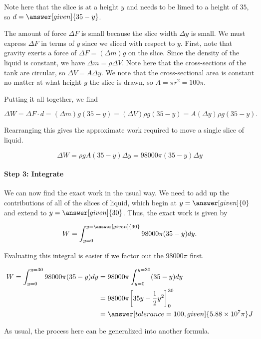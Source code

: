 \documentclass{ximera}
\begin{document}
\begin{model}
\begin{explanation}
Note here that the slice is at a height $y$ and needs to be limed to a height of $35$, so $d=\answer[given]{35-y}$.  

The amount of force $\Delta F$ is small because the slice width $\Delta y$ is small.  We must express $\Delta F$ in terms of $y$ since we sliced with respect to $y$.  First, note that gravity exerts a force of $\Delta F = (\Delta m) g $ on the slice.  Since the density of the liquid is constant, we have $\Delta m = \rho \Delta V$.  Note here that the cross-sections of the tank are circular, so $\Delta V = A \Delta y$.  We note that the cross-sectional area is constant no matter at what height $y$ the slice is drawn, so $A = \pi r^2 = 100 \pi$.

Putting it all together, we find

\[ \Delta W = \Delta F \cdot d = (\Delta m) g (35-y) = (\Delta V) \rho g (35-y) = A (\Delta y) \rho g (35-y) . \]

Rearranging this gives the approximate work required to move a single slice of liquid.

\[
\Delta W = \rho g A (35-y) \Delta y = 98000 \pi (35-y) \Delta y
\]

\paragraph{Step 3: Integrate} 

We can now find the exact work in the usual way.  We need to add up the contributions of all of the slices of liquid, which begin at $y=\answer[given]{0}$ and extend to $y=\answer[given]{30}$.  Thus, the exact work is given by

\[ W = \int_{y=0}^{y= \answer[given]{30}} 98000\pi(35-y) dy. \]

Evaluating this integral is easier if we factor out the $98000\pi$ first.

\begin{align*}
W = \int_{y=0}^{y= 30} 98000\pi(35-y) dy &= 98000\pi  \int_{y=0}^{y= 30} (35-y) dy\\
&= 98000\pi \bigg[35y-\frac{1}{2}y^2\bigg]_0^{30} \\
&= \answer[tolerance=100,given]{ 5.88 \times 10^7 \pi} J
\end{align*}
\end{explanation}

\end{model}

As usual, the process here can be generalized into another formula.  
\end{document}
